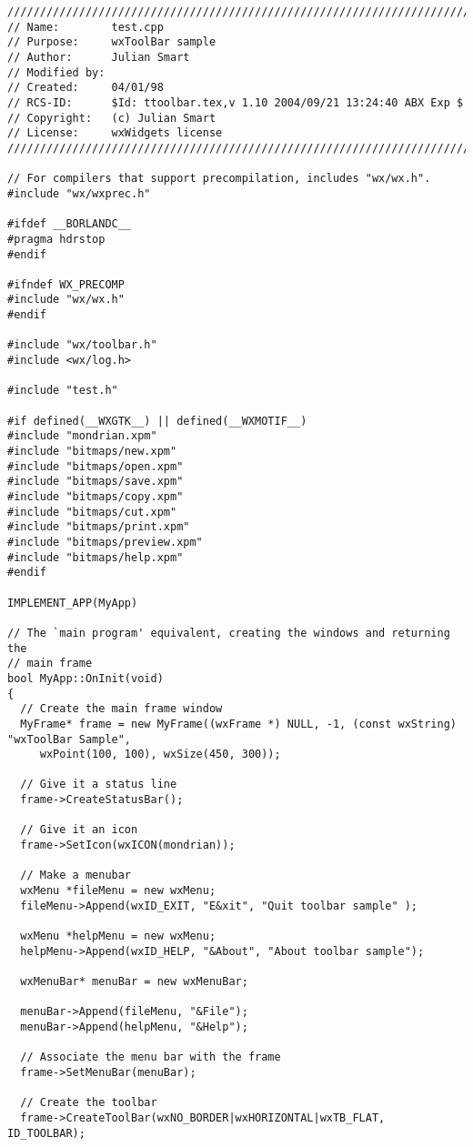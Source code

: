 {\small
\begin{verbatim}
/////////////////////////////////////////////////////////////////////////////
// Name:        test.cpp
// Purpose:     wxToolBar sample
// Author:      Julian Smart
// Modified by:
// Created:     04/01/98
// RCS-ID:      $Id: ttoolbar.tex,v 1.10 2004/09/21 13:24:40 ABX Exp $
// Copyright:   (c) Julian Smart
// License:   	wxWidgets license
/////////////////////////////////////////////////////////////////////////////

// For compilers that support precompilation, includes "wx/wx.h".
#include "wx/wxprec.h"

#ifdef __BORLANDC__
#pragma hdrstop
#endif

#ifndef WX_PRECOMP
#include "wx/wx.h"
#endif

#include "wx/toolbar.h"
#include <wx/log.h>

#include "test.h"

#if defined(__WXGTK__) || defined(__WXMOTIF__)
#include "mondrian.xpm"
#include "bitmaps/new.xpm"
#include "bitmaps/open.xpm"
#include "bitmaps/save.xpm"
#include "bitmaps/copy.xpm"
#include "bitmaps/cut.xpm"
#include "bitmaps/print.xpm"
#include "bitmaps/preview.xpm"
#include "bitmaps/help.xpm"
#endif

IMPLEMENT_APP(MyApp)

// The `main program' equivalent, creating the windows and returning the
// main frame
bool MyApp::OnInit(void)
{
  // Create the main frame window
  MyFrame* frame = new MyFrame((wxFrame *) NULL, -1, (const wxString) "wxToolBar Sample",
     wxPoint(100, 100), wxSize(450, 300));

  // Give it a status line
  frame->CreateStatusBar();

  // Give it an icon
  frame->SetIcon(wxICON(mondrian));

  // Make a menubar
  wxMenu *fileMenu = new wxMenu;
  fileMenu->Append(wxID_EXIT, "E&xit", "Quit toolbar sample" );

  wxMenu *helpMenu = new wxMenu;
  helpMenu->Append(wxID_HELP, "&About", "About toolbar sample");

  wxMenuBar* menuBar = new wxMenuBar;

  menuBar->Append(fileMenu, "&File");
  menuBar->Append(helpMenu, "&Help");

  // Associate the menu bar with the frame
  frame->SetMenuBar(menuBar);

  // Create the toolbar
  frame->CreateToolBar(wxNO_BORDER|wxHORIZONTAL|wxTB_FLAT, ID_TOOLBAR);
  

\end{verbatim}}
